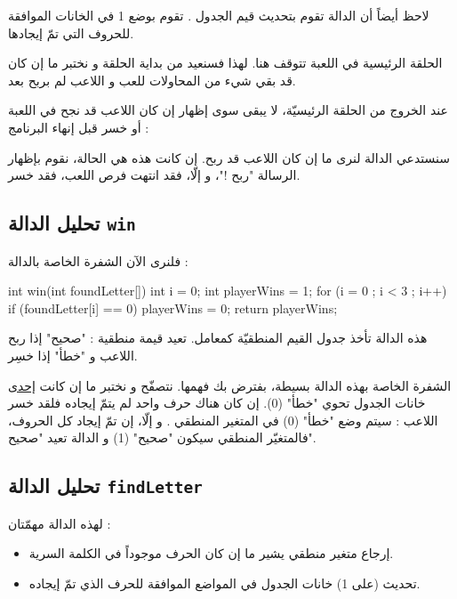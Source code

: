 \begin{information}
لاحظ أيضاً أن الدالة
تقوم بتحديث قيم الجدول
.
تقوم بوضع 1 في الخانات الموافقة للحروف التي تمّ إيجادها.
\end{information}

الحلقة الرئيسية في اللعبة تتوقف هنا. لهذا فسنعيد من بداية الحلقة و نختبر ما إن كان قد بقي شيء من المحاولات للعب و اللاعب لم بربح بعد.

عند الخروج من الحلقة الرئيسيّة، لا يبقى سوى إظهار إن كان اللاعب قد نجح في اللعبة أو خسر قبل إنهاء البرنامج :

\begin{Csource}
if (win(foundLetter))
	printf("\n\nYou win! the secret word is : %
else
	printf("\n\nYou lose ! the secret word is : %
return 0;
}
\end{Csource}

سنستدعي الدالة
لنرى ما إن كان اللاعب قد ربح. إن كانت هذه هي الحالة، نقوم بإظهار الرسالة "ربح !"، و إلّا، فقد انتهت فرص اللعب، فقد خسر.

\subsection{تحليل الدالة
\texttt{win}}
فلنرى الآن الشفرة الخاصة بالدالة
 :

\begin{Csource}
int win(int foundLetter[])
{
  int i = 0;
  int playerWins = 1;
  for (i = 0 ; i < 3 ; i++)
  {
    if (foundLetter[i] == 0)
    playerWins = 0;
  }
  return playerWins;
}
\end{Csource}

هذه الدالة تأخذ جدول القيم المنطقيّة
كمعامل. تعيد قيمة منطقية : "صحيح" إذا ربح اللاعب و "خطأ" إذا خسِر.

الشفرة الخاصة بهذه الدالة بسيطة، بفترض بك فهمها. نتصفّح
و نختبر ما إن كانت
\underline{إحدى}
خانات الجدول تحوي "خطأ" (0). إن كان هناك حرف واحد لم يتمّ إيجاده فلقد خسر اللاعب : سيتم وضع "خطأ" (0) في المتغير المنطقي
.
و إلّا، إن تمّ إيجاد كل الحروف، فالمتغيّر المنطقي سيكون "صحيح" (1) و الدالة تعيد "صحيح".

\subsection{تحليل الدالة
\texttt{findLetter}}
لهذه الدالة مهمّتان :
\begin{itemize}
  \item إرجاع متغير منطقي يشير ما إن كان الحرف موجوداً في الكلمة السرية.
  \item تحديث (على 1) خانات الجدول
في المواضع الموافقة للحرف الذي تمّ إيجاده.
\end{itemize}

